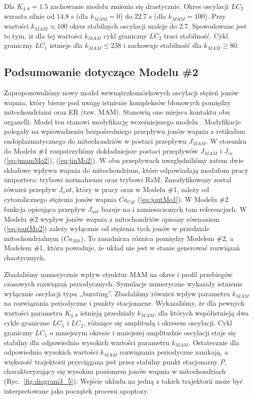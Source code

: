 Dla $K_{4,8}=1.5$ zachowanie modelu zmienia się drastycznie. Okres oscylacji $LC_2$ wzrasta silnie od 14.8 s (dla $k_{MAM}=0$) do 22.7 s (dla $k_{MAM}=100$). Przy wartości $k_{MAM} \approx 100$ okres stabilnych oscylacji maleje do 2.7. Spowodowane jest to tym, iż dla tej wartości $k_{MAM}$ cykl graniczny $LC_2$ traci stabilność. Cykl graniczny $LC_1$ istnieje dla $k_{MAM} \leq 238$ i zachowuje stabilność dla $k_{MAM} \geq 80$.


\subsection{Podsumowanie dotyczące Modelu \#2}
Zaproponowaliśmy nowy model wewnątrzkomórkowych oscylacji stężeń jonów wapnia, który bierze pod uwagę istnienie kompleksów błonowych pomiędzy mitochondriami oraz ER (tzw. MAM). Stanowią one miejsca kontaktu obu organelli. Model ten stanowi modyfikację wcześniejszego  modelu \cite{Marhl2000}. Modyfikacje polegały na wprowadzeniu bezpośredniego przepływu jonów wapnia z retikulum endoplazmatycznego do mitochondriów w postaci przepływu $J_{MAM}$. W stosunku do Modelu \#1 rozpatrzyliśmy dokładniejsze postaci przepływów $J_{MAM}$ i $J_{in}$ (\ref{eq:jmamMo2}), (\ref{eq:jinMo2}). W obu przepływach uwzględniliśmy zatem dwie składowe wpływu wapnia do mitochondrium, które odpowiadają modułom pracy uniportera: trybowi normalnemu oraz trybowi RaM. Zmodyfikowany został również przepływ $J_out$, który w pracy \cite{Marhl2000} oraz w Modelu \#1, zależy od cytozolicznego stężenia jonów wapnia $Ca_{Cyt}$ (\ref{eq:joutMo1}). W Modelu \#2 funkcja opisująca przepływ $J_{out}$ bazuje na \cite{Magnus1997,Mazel2009} i zamieszczonych tam referencjach. W Modelu \#2 wypływ jonów wapnia z mitochondriów opisany równaniem (\ref{eq:joutMo2}) zależy wyłącznie od stężenia tych jonów w przedziale mitochondrialnym ($Ca_{Mit}$). To zasadnicza różnica pomiędzy Modelem \#2, a Modelem \#1, która powoduje, że układ nie jest w stanie generować rozwiązań chaotycznych.

Zbadaliśmy numerycznie wpływ struktur MAM  na okres i profil przebiegów czasowych rozwiązań periodycznych. Symulacje numeryczne wykazały istnienie wyłącznie oscylacji typu ,,bursting''. Zbadaliśmy również  wpływ parametru $k_{MAM}$ na rozwiązania periodyczne i punkty stacjonarne. Wykazaliśmy, że dla pewnych wartości parametru $K_{4,8}$ istnieją przedziały $k_{MAM}$, dla których współistnieją dwa cykle graniczne $LC_1$ i $LC_2$, różniące się amplitudą  i okresem oscylacji. Cykl graniczny $LC_1$ o mniejszym okresie i mniejszej amplitudzie oscylacji staje się stabilny  dla odpowiednio wysokich wartości parametru $k_{MAM}$. Ostatecznie dla odpowiednio wysokich wartości $k_{MAM}$ rozwiązania periodyczne zanikają, a większość trajektorii przyciągana jest przez stabilny punkt stacjonarny $P$, charakteryzujący się wysokim poziomem jonów wapnia w mitochondriach (Ryc.~\ref{fig:diagram3_5}). Wejście układu na jedną z takich trajektorii może być interpretowane jako początek procesu apoptozy.


